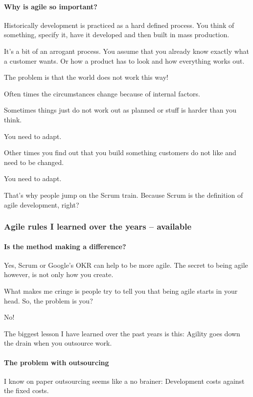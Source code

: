 \documentclass[12pt]{scrartcl} %
\begin{document}
\paragraph{Why is agile so important?}
Historically development is practiced as a hard defined process. You think of something, specify it, have it developed and then built in mass production.

It’s a bit of an arrogant process. You assume that you already know exactly what a customer wants. Or how a product has to look and how everything works out.

The problem is that the world does not work this way!

Often times the circumstances change because of internal factors.

Sometimes things just do not work out as planned or stuff is harder than you think.

You need to adapt.

Other times you find out that you build something customers do not like and need to be changed.

You need to adapt.

That’s why people jump on the Scrum train. Because Scrum is the definition of agile development, right?

\subsubsection{Agile rules I learned over the years -- available}

\paragraph{Is the method making a difference?}
Yes, Scrum or Google’s OKR can help to be more agile. The secret to being agile however, is not only how you create.

What makes me cringe is people try to tell you that being agile starts in your head. So, the problem is you?

No!

The biggest lesson I have learned over the past years is this: Agility goes down the drain when you outsource work.

\paragraph{The problem with outsourcing}
I know on paper outsourcing seems like a no brainer: Development costs against the fixed costs.
\end{document}
